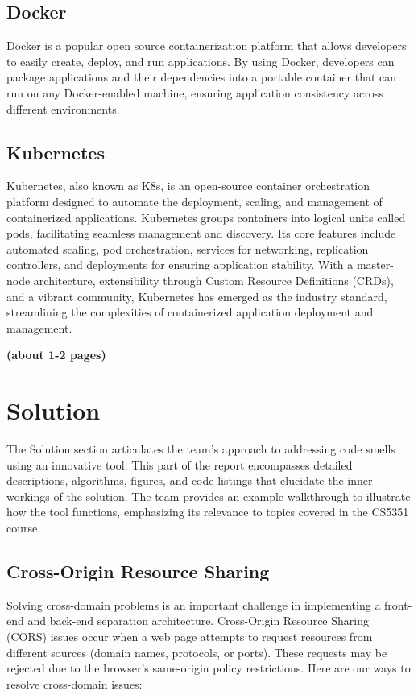 \documentclass[journal]{IEEEtran}
\begin{document}
\subsection{Docker}
Docker is a popular open source containerization platform that allows developers to easily create, deploy, and run applications. By using Docker, developers can package applications and their dependencies into a portable container that can run on any Docker-enabled machine, ensuring application consistency across different environments.

\subsection{Kubernetes}
Kubernetes, also known as K8s, is an open-source container orchestration platform designed to automate the deployment, scaling, and management of containerized applications.  Kubernetes groups containers into logical units called pods, facilitating seamless management and discovery. Its core features include automated scaling, pod orchestration, services for networking, replication controllers, and deployments for ensuring application stability. With a master-node architecture, extensibility through Custom Resource Definitions (CRDs), and a vibrant community, Kubernetes has emerged as the industry standard, streamlining the complexities of containerized application deployment and management.

\textbf{(about 1-2 pages)}

\section{Solution}
\noindent The Solution section articulates the team's approach to addressing code smells using an innovative tool. This part of the report encompasses detailed descriptions, algorithms, figures, and code listings that elucidate the inner workings of the solution. The team provides an example walkthrough to illustrate how the tool functions, emphasizing its relevance to topics covered in the CS5351 course.

\subsection{Cross-Origin Resource Sharing}
Solving cross-domain problems is an important challenge in implementing a front-end and back-end separation architecture. Cross-Origin Resource Sharing (CORS) issues occur when a web page attempts to request resources from different sources (domain names, protocols, or ports). These requests may be rejected due to the browser's same-origin policy restrictions. Here are our ways to resolve cross-domain issues:
\end{document}
